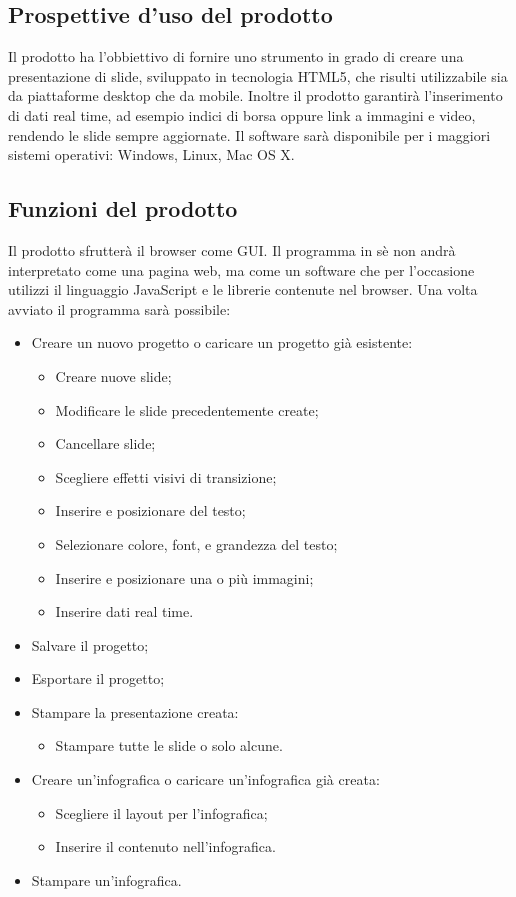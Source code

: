 \subsection{Prospettive d'uso del prodotto}
Il prodotto ha l'obbiettivo di fornire uno strumento in grado di creare una presentazione di slide, sviluppato in tecnologia \gls{HTML5}, che risulti utilizzabile sia da piattaforme desktop che da mobile. Inoltre il prodotto garantirà l'inserimento di dati \gls{real time}, ad esempio indici di borsa oppure link a immagini e video, rendendo le slide sempre aggiornate. Il software sarà disponibile per i maggiori sistemi operativi: \gls{Windows}, \gls{Linux}, \gls{Mac OS X}.

\subsection{Funzioni del prodotto}
Il prodotto sfrutterà il \gls{browser} come \gls{GUI}. Il programma in sè non andrà interpretato come una pagina web, ma come un software che per l'occasione utilizzi il linguaggio \gls{JavaScript} e le librerie contenute nel \gls{browser}.
Una volta avviato il programma sarà possibile:
\begin{itemize}
	\item Creare un nuovo progetto o caricare un progetto già esistente:
	\begin{itemize}
		\item Creare nuove slide;
		\item Modificare le slide precedentemente create;
		\item Cancellare slide;
		\item Scegliere effetti visivi di transizione;
		\item Inserire e posizionare del testo;
		\item Selezionare colore, \gls{font}, e grandezza del testo;
		\item Inserire e posizionare una o più immagini;
		\item Inserire dati \gls{real time}.
	\end{itemize}
	\item Salvare il progetto;
	\item Esportare il progetto;
	\item Stampare la presentazione creata:
	\begin{itemize}
		\item Stampare tutte le slide o solo alcune.
	\end{itemize}
	\item Creare un'\gls{infografica} o caricare un'\gls{infografica} già creata:
	\begin{itemize}
		\item Scegliere il \gls{layout} per l'\gls{infografica};
		\item Inserire il contenuto nell'\gls{infografica}.
	\end{itemize}
	\item Stampare un'\gls{infografica}.
\end{itemize}

